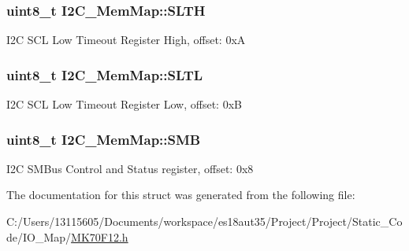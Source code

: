 \subsubsection[{S\+L\+T\+H}]{\setlength{\rightskip}{0pt plus 5cm}uint8\+\_\+t I2\+C\+\_\+\+Mem\+Map\+::\+S\+L\+T\+H}\label{struct_i2_c___mem_map_aac56d4be80ad622d7bf85bdd8c29504c}
I2\+C S\+C\+L Low Timeout Register High, offset\+: 0x\+A \hypertarget{struct_i2_c___mem_map_afd5aa3cef3245893addeb55556e1ceff}{}
\subsubsection[{S\+L\+T\+L}]{\setlength{\rightskip}{0pt plus 5cm}uint8\+\_\+t I2\+C\+\_\+\+Mem\+Map\+::\+S\+L\+T\+L}\label{struct_i2_c___mem_map_afd5aa3cef3245893addeb55556e1ceff}
I2\+C S\+C\+L Low Timeout Register Low, offset\+: 0x\+B \hypertarget{struct_i2_c___mem_map_a14ca29af4960a6588080acb71f62d5fa}{}
\subsubsection[{S\+M\+B}]{\setlength{\rightskip}{0pt plus 5cm}uint8\+\_\+t I2\+C\+\_\+\+Mem\+Map\+::\+S\+M\+B}\label{struct_i2_c___mem_map_a14ca29af4960a6588080acb71f62d5fa}
I2\+C S\+M\+Bus Control and Status register, offset\+: 0x8 

The documentation for this struct was generated from the following file\+:\begin{DoxyCompactItemize}
\item 
C\+:/\+Users/13115605/\+Documents/workspace/es18aut35/\+Project/\+Project/\+Static\+\_\+\+Code/\+I\+O\+\_\+\+Map/\hyperlink{_m_k70_f12_8h}{M\+K70\+F12.\+h}\end{DoxyCompactItemize}
